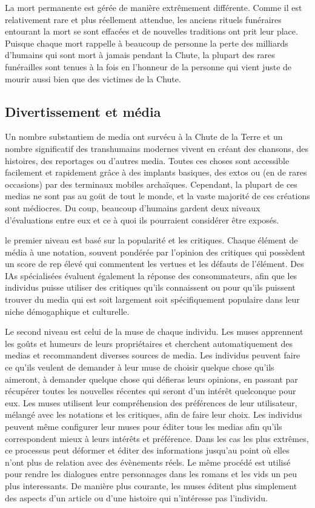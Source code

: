                La mort permanente est gérée de manière extrêmement différente. Comme il est relativement rare et plus réellement attendue, les anciens rituels funéraires entourant la mort se sont effacées et de nouvelles traditions ont prit leur place. Puisque chaque mort rappelle à beaucoup de personne la perte des milliards d'humains qui sont mort à jamais pendant la Chute, la plupart des rares funérailles sont tenues à la fois en l'honneur de la personne qui vient juste de mourir aussi bien que des victimes de la Chute. 

               \subsection{Divertissement et média} \label{sec:entertainment-media} 

               Un nombre substantiem de media ont survécu à la Chute de la Terre et un nombre significatif des transhumains modernes vivent en créant des chansons, des histoires, des reportages ou d'autres media. Toutes ces choses sont accessible facilement et rapidement grâce à des implants basiques, des extos ou (en de rares occasions) par des terminaux mobiles archaïques. Cependant, la plupart de ces medias ne sont pas au goüt de tout le monde, et la vaste majorité de ces créations sont médiocres. Du coup, beaucoup d'humains gardent deux niveaux d'évaluations entre eux et ce à quoi ils pourraient considérer être exposés. 

               le premier niveau est basé sur la popularité et les critiques. Chaque élément de média à une notation, souvent pondérée par l'opinion des critiques qui possèdent un score de rep élevé qui commentent les vertues et les défauts de l'élément. Des IAs spécialisées évaluent également la réponse des consommateurs, afin que les individus puisse utiliser des critiques qu'ils connaissent ou pour qu'ils puissent trouver du media qui est soit largement soit spécifiquement populaire dans leur niche démogaphique et culturelle. 

               Le second niveau est celui de la muse de chaque individu. Les muses apprennent les goûts et humeurs de leurs propriétaires et cherchent automatiquement des medias et recommandent diverses sources de media. Les individus peuvent faire ce qu'ils veulent de demander à leur muse de choisir quelque chose qu'ils aimeront, à demander quelque chose qui défieras leurs opinions, en passant par récupérer toutes les nouvelles récentes qui seront d'un intérêt quelconque pour eux. Les muses utilisent leur compréhension des préférences de leur utilisateur, mélangé avec les notations et les critiques, afin de faire leur choix. Les individus peuvent même configurer leur muses pour éditer tous les medias afin qu'ils correspondent mieux à leurs intérêts et préférence. Dans les cas les plus extrêmes, ce processus peut déformer et éditer des informations jusqu'au point où elles n'ont plus de relation avec des évènements réels. Le même procédé est utilisé pour rendre les dialogues entre personnages dans les romans et les vids un peu plus interessants. De manière plus courante, les muses éditent plus simplement des aspects d'un article ou d'une histoire qui n'intéresse pas l'individu. 

